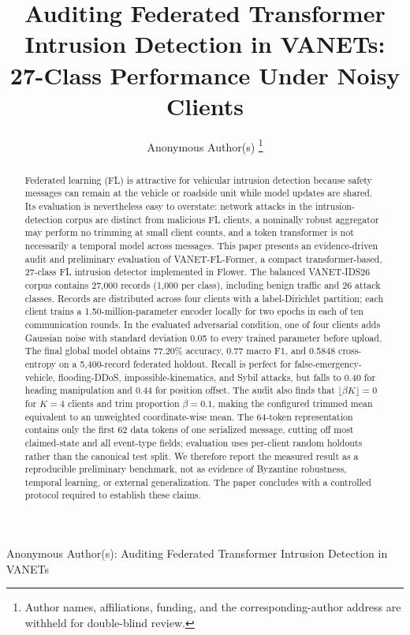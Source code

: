 \documentclass[journal]{IEEEtran}
\newcommand{\method}{VANET-FL-Former}
\newcommand{\todoauthor}{Anonymous Author(s)}
\begin{document}
\title{Auditing Federated Transformer Intrusion Detection in VANETs:\\
27-Class Performance Under Noisy Clients}

\author{\todoauthor%
\thanks{Author names, affiliations, funding, and the corresponding-author address are withheld for double-blind review.}}

%
{Anonymous Author(s): Auditing Federated Transformer Intrusion Detection in VANETs}

\maketitle

\begin{abstract}
Federated learning (FL) is attractive for vehicular intrusion detection because safety messages can remain at the vehicle or roadside unit while model updates are shared. Its evaluation is nevertheless easy to overstate: network attacks in the intrusion-detection corpus are distinct from malicious FL clients, a nominally robust aggregator may perform no trimming at small client counts, and a token transformer is not necessarily a temporal model across messages. This paper presents an evidence-driven audit and preliminary evaluation of \method, a compact transformer-based, 27-class FL intrusion detector implemented in Flower. The balanced VANET-IDS26 corpus contains 27,000 records (1,000 per class), including benign traffic and 26 attack classes. Records are distributed across four clients with a label-Dirichlet partition; each client trains a 1.50-million-parameter encoder locally for two epochs in each of ten communication rounds. In the evaluated adversarial condition, one of four clients adds Gaussian noise with standard deviation 0.05 to every trained parameter before upload. The final global model obtains 77.20\% accuracy, 0.77 macro F1, and 0.5848 cross-entropy on a 5,400-record federated holdout. Recall is perfect for false-emergency-vehicle, flooding-DDoS, impossible-kinematics, and Sybil attacks, but falls to 0.40 for heading manipulation and 0.44 for position offset. The audit also finds that $\lfloor\beta K\rfloor=0$ for $K=4$ clients and trim proportion $\beta=0.1$, making the configured trimmed mean equivalent to an unweighted coordinate-wise mean. The 64-token representation contains only the first 62 data tokens of one serialized message, cutting off most claimed-state and all event-type fields; evaluation uses per-client random holdouts rather than the canonical test split. We therefore report the measured result as a reproducible preliminary benchmark, not as evidence of Byzantine robustness, temporal learning, or external generalization. The paper concludes with a controlled protocol required to establish these claims.
\end{abstract}
\end{document}
